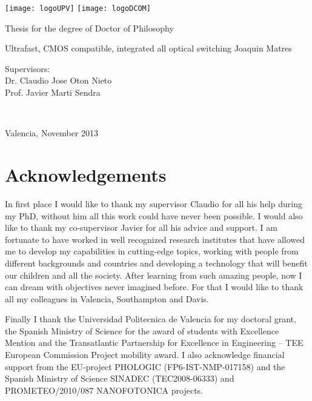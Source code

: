\documentclass[a4paper]{report}
\begin{document}
\pagestyle{empty}
\noindent
\texttt{[image: logoUPV]}
\hspace{\fill}
\texttt{[image: logoDCOM]}
\vspace{2cm}
\begin{center}
 \Large Thesis for the degree of Doctor of Philosophy
\end{center}
\vspace{3cm}
\begin{center}
 \Huge Ultrafast, CMOS compatible, integrated all optical switching\vspace{1.5cm}
 \vspace{2cm}
 \Large Joaquin Matres
\end{center}
\vspace{2cm}
\begin{flushleft}Supervisors:\\\large
\vspace{0.3cm}Dr. Claudio Jose Oton Nieto\\ Prof. Javier Marti Sendra
\end{flushleft}
\centerline{\\[1.0cm]}
\centerline{Valencia, November 2013}

\pagestyle{empty}
\tableofcontents

\chapter*{Acknowledgements}
In first place I would like to thank my supervisor Claudio for all his help during my PhD, without him all this work could have never been possible. I would also like to thank my co-supervisor Javier for all his advice and support.
I am fortunate to have worked in well recognized research institutes that have allowed me to develop my capabilities in cutting-edge topics, working with people from different backgrounds and countries and developing a technology that will benefit our children and all the society. After learning from such amazing people, now I can dream with objectives never imagined before. For that I would like to thank all my colleagues in Valencia, Southampton and Davis. 

Finally I thank the Universidad Politecnica de Valencia for my doctoral grant, the Spanish Ministry of Science for the award of students with Excellence Mention and the Transatlantic Partnership for Excellence in Engineering – TEE European Commission Project mobility award. I also acknowledge financial support from the EU-project PHOLOGIC (FP6-IST-NMP-017158) and the Spanish Ministry of Science SINADEC (TEC2008-06333) and PROMETEO/2010/087 NANOFOTONICA projects.



	








\appendix
	




\end{document}
